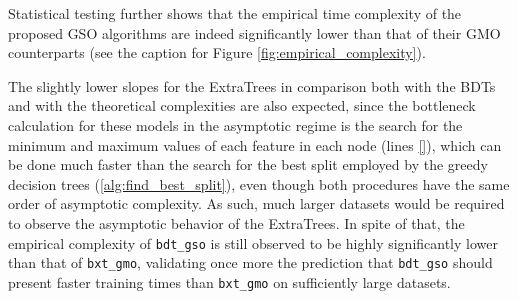 Statistical testing further shows that the empirical time complexity of the proposed GSO algorithms are indeed significantly lower than that of their GMO counterparts (see the caption for Figure \ref{fig:empirical_complexity}).


The slightly lower slopes for the ExtraTrees in comparison both with the BDTs and with the theoretical complexities are also expected, since the bottleneck calculation for these models in the asymptotic regime is the search for the minimum and maximum values of each feature in each node (lines \ref{}), which can be done much faster than the search for the best split employed by the greedy decision trees (\autoref{alg:find_best_split}), even though both procedures have the same order of asymptotic complexity. As such, much larger datasets would be required to observe the asymptotic behavior of the ExtraTrees.
In spite of that, the empirical complexity of \texttt{bdt\_gso} is still observed to be highly significantly lower than that of \texttt{bxt\_gmo}, validating once more the prediction that \texttt{bdt\_gso} should present faster training times than \texttt{bxt\_gmo} on sufficiently large datasets.

